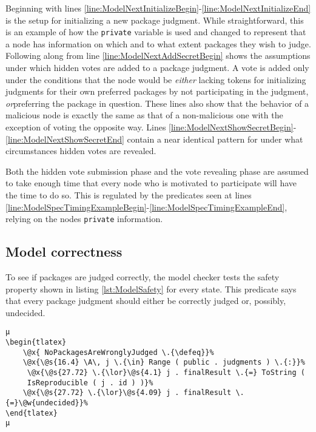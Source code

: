 Beginning with lines \ref{line:ModelNextInitializeBegin}-\ref{line:ModelNextInitializeEnd} is the setup for initializing a new package judgment. While straightforward, this is an example of how the \texttt{private} variable is used and changed to represent that a node has information on which and to what extent packages they wish to judge. Following along from line \ref{line:ModelNextAddSecretBegin} shows the assumptions under which hidden votes are added to a package judgment. A vote is added only under the conditions that the node would be \emph{either} lacking tokens for initializing judgments for their own preferred packages by not participating in the judgment, \emph{or}preferring the package in question. These lines also show that the behavior of a malicious node is exactly the same as that of a non-malicious one with the exception of voting the opposite way. Lines \ref{line:ModelNextShowSecretBegin}-\ref{line:ModelNextShowSecretEnd} contain a near identical pattern for under what circumstances hidden votes are revealed.

Both the hidden vote submission phase and the vote revealing phase are assumed to take enough time that every node who is motivated to participate will have the time to do so. This is regulated by the predicates seen at lines \ref{line:ModelSpecTimingExampleBegin}-\ref{line:ModelSpecTimingExampleEnd}, relying on the nodes \texttt{private} information.

\subsection{Model correctness}
\label{subsec:ModelModelCorrectness}

To see if packages are judged correctly, the model checker tests the safety property shown in listing \ref{lst:ModelSafety} for every state. This predicate says that every package judgment should either be correctly judged or, possibly, undecided.

\begin{lstlisting}[caption=Model safety property
    , label=lst:ModelSafety]
µ
\begin{tlatex}
    \@x{ NoPackagesAreWronglyJudged \.{\defeq}}%
    \@x{\@s{16.4} \A\, j \.{\in} Range ( public . judgments ) \.{:}}%
     \@x{\@s{27.72} \.{\lor}\@s{4.1} j . finalResult \.{=} ToString (
     IsReproducible ( j . id ) )}%
    \@x{\@s{27.72} \.{\lor}\@s{4.09} j . finalResult \.{=}\@w{undecided}}%
\end{tlatex}
µ
\end{lstlisting}

